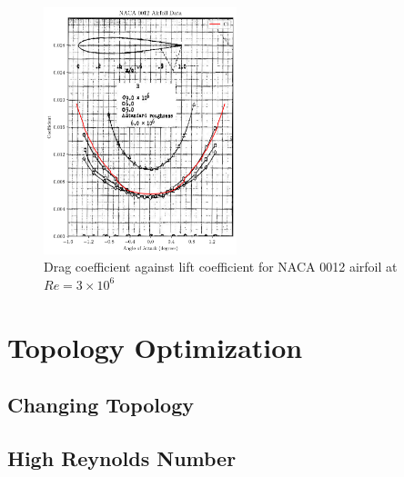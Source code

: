 \documentclass{article}
\begin{document}
\begin{figure}[H]
    \centering
    \includegraphics[width=0.5\textwidth]{figures/NACA0012_drag_validation.png}
    \caption{Drag coefficient against lift coefficient for NACA 0012 airfoil at $Re = 3\times10^6$}
    \label{fig:0012_drag_validation}
\end{figure}

\section{Topology Optimization}

\subsection{Changing Topology}

\subsection{High Reynolds Number}
\end{document}

